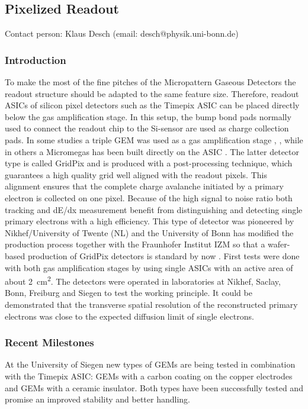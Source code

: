 \subsection{Pixelized Readout}\label{chap:TPC_sec:pixels}
Contact person: Klaus Desch (email: desch@physik.uni-bonn.de)\\

\subsubsection{Introduction}
To make the most of the fine pitches of the Micropattern Gaseous Detectors the
readout structure should be adapted to the same feature size. Therefore,
readout ASICs of silicon pixel detectors such as the Timepix ASIC
\cite{Llopart2007485,Llopart2008106} can be placed directly below the gas amplification
stage. In this setup, the bump bond pads normally used to connect the readout
chip to the Si-sensor are used as charge collection pads. In some studies a
triple GEM was used as a gas amplification stage \cite{Bamberger:2006xp},
\cite{6359808}, while in others a Micromegas has been built
directly on the ASIC \cite{Chefdeville2006490}. The latter detector type is
 called GridPix and is produced with a post-processing technique, which
 guarantees a high quality grid well aligned with the readout pixels. This
 alignment ensures that the complete charge avalanche initiated by a primary
 electron is collected on one pixel. Because of the high signal to noise
 ratio both tracking and dE/dx measurement benefit from distinguishing and
 detecting single primary electrons with a high efficiency. This type of
 detector was pioneered by Nikhef/University of Twente (NL) and the University
 of Bonn has modified the
 production process together with the Fraunhofer Institut IZM so that a
 wafer-based production of GridPix detectors is standard by now
 \cite{Koppert2013245}. First tests were done with both
 gas amplification stages by using single ASICs with an active area of about \SI{2}{\centi\meter\squared}. The detectors were operated in laboratories at Nikhef, Saclay, Bonn,
 Freiburg and Siegen to test the working principle. It could be demonstrated
 that the transverse spatial resolution of the reconstructed primary electrons
 was close to the expected diffusion limit of single electrons.


\subsubsection{Recent Milestones}
At the University of Siegen new types of GEMs are being tested in combination
with the Timepix ASIC: GEMs with a
carbon coating on the copper electrodes and GEMs with a ceramic
insulator. Both types have been successfully tested and promise an improved
stability and better handling.

